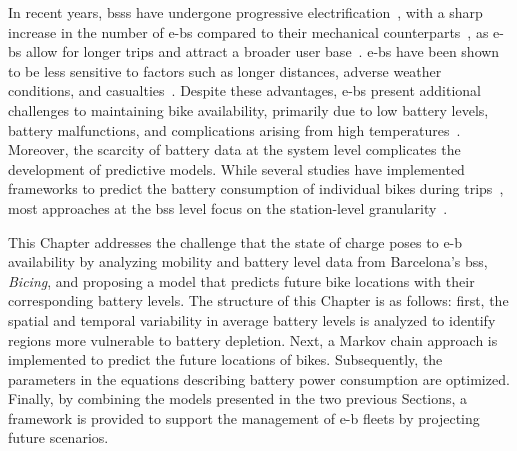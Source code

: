 In recent years, \acp{bss} have undergone progressive electrification~\cite{MeddinWorldMap2025, Galatoulas2020}, with a sharp increase in the number of \acp{e-b} compared to their mechanical counterparts~\cite{Galatoulas2020, Bielinski2020}, as \acp{e-b} allow for longer trips and attract a broader user base~\cite{Simsekoglu2019, Weinert2007}. \acp{e-b} have been shown to be less sensitive to factors such as longer distances, adverse weather conditions, and casualties~\cite{Wamburu2021, Campbell2016, Siman2018}. Despite these advantages, \acp{e-b} present additional challenges to maintaining bike availability, primarily due to low battery levels, battery malfunctions, and complications arising from high temperatures~\cite{Ji2014, Florez2018, Zhang2019, Usama2019}. Moreover, the scarcity of battery data at the system level complicates the development of predictive models. While several studies have implemented frameworks to predict the battery consumption of individual bikes during trips~\cite{Burani2022, Steyn2014}, most approaches at the \ac{bss} level focus on the station-level granularity~\cite{Zhou2023}.

This Chapter addresses the challenge that the state of charge poses to \ac{e-b} availability by analyzing mobility and battery level data from Barcelona's \ac{bss}, \textit{Bicing}, and proposing a model that predicts future bike locations with their corresponding battery levels. The structure of this Chapter is as follows: first, the spatial and temporal variability in average battery levels is analyzed to identify regions more vulnerable to battery depletion. Next, a Markov chain approach is implemented to predict the future locations of bikes. Subsequently, the parameters in the equations describing battery power consumption are optimized. Finally, by combining the models presented in the two previous Sections, a framework is provided to support the management of \ac{e-b} fleets by projecting future scenarios.